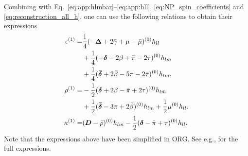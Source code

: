 \documentclass[aps,prd,amsmath,floats,floatfix, twocolumn,
superscriptaddress,nofootinbib,showpacs]{revtex4-1}
\newcommand{\red}{\textcolor{red}}
\newcommand{\hertzbar}{\bar{\Psi}_{\rm ORG}}
\begin{document}
Combining with Eq.~\eqref{eq:app:hlmbar}--\eqref{eq:app:hll}, \eqref{eq:NP_spin_coefficients} and \eqref{eq:reconstruction_all_h}, one can use the following relations to obtain their expressions
\begin{align}
    \epsilon^{(1)}=&\frac{1}{4}(-\bm{\Delta}+2\bar{\gamma}+\mu-\bar{\mu})^{(0)}h_{ll} \notag \\
    &+\frac{1}{4}(-\bm{\delta}-2\beta+\bar{\pi}-2\tau)^{(0)}h_{l\bar{m}}\notag \\
    &+\frac{1}{4}(\bm{\bar{\delta}}+2\bar{\beta}-5\pi-2\bar{\tau})^{(0)}h_{lm}. \\
    \rho^{(1)}=&-\frac{1}{2}(\bm{\delta}+2\beta-\bar{\pi}+2\tau)^{(0)}h_{l\bar{m}}\notag \\
    &+\frac{1}{2}(\bm{\bar{\delta}}-3\pi+2\bar{\beta})^{(0)}h_{lm}+\frac{1}{2}\mu^{(0)} h_{ll}. \\
    \kappa^{(1)}=&(\bm{D}-\bar{\rho})^{(0)}h_{lm}-\frac{1}{2}(\bm{\delta}-\bar{\pi}+\tau)^{(0)}h_{ll}.
\end{align}
Note that the expressions above have been simplified in ORG. See e.g., \cite{Loutrel:2020wbw} for the full expressions.




\end{document}
